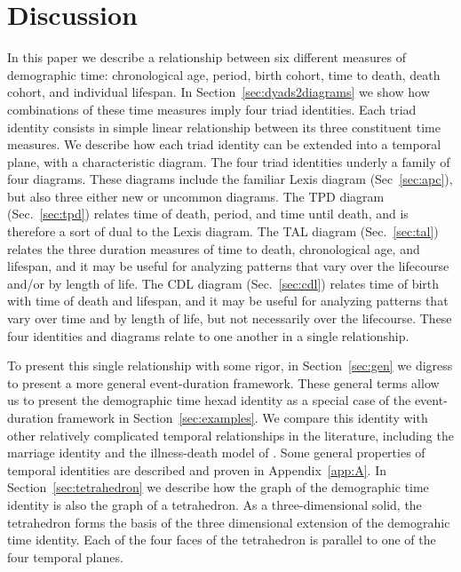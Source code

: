 \documentclass[12pt,oneside,a4paper]{article} %
\theoremstyle{definition}
\begin{document}
\section{Discussion}

In this paper we describe a relationship between six different measures of
demographic time: chronological age, period, birth cohort, time to death, death
cohort, and individual lifespan. In Section~\ref{sec:dyads2diagrams} we show how
combinations of these time measures imply four triad identities. Each
triad identity consists in simple linear relationship between its three
constituent time measures. We describe how each triad identity can be
extended into a temporal plane, with a characteristic diagram. The four triad
identities underly a family of four diagrams. These diagrams include the
familiar Lexis diagram (Sec~\ref{sec:apc}), but also three either new or
uncommon diagrams.
The TPD diagram (Sec.~\ref{sec:tpd}) relates time of death, period, and time
until death, and is therefore a sort of dual to the Lexis diagram. The TAL
diagram (Sec.~\ref{sec:tal}) relates the three duration measures of time to
death, chronological age, and lifespan, and it may be useful for analyzing patterns that vary over the lifecourse and/or by length of life.
The CDL diagram (Sec.~\ref{sec:cdl}) relates time of birth with time of death
and lifespan, and it may be useful for analyzing patterns that vary over time and by length of life,
but not necessarily over the lifecourse. These four identities and diagrams
relate to one another in a single relationship.

To present this single relationship with some rigor, in Section~\ref{sec:gen} we
digress to present a more general event-duration framework. These general terms
allow us to present the demographic time hexad identity as a special case of the
event-duration framework in Section~\ref{sec:examples}.
We compare this identity with other relatively complicated temporal
relationships in the literature, including the \citet{lexis1875einleitung}
marriage identity and the illness-death model of \citet{brinks}. Some general
properties of temporal identities are described and proven in
Appendix~\ref{app:A}.
In Section~\ref{sec:tetrahedron} we describe how the graph of the demographic time identity is also the graph of a tetrahedron. As a three-dimensional solid, the tetrahedron forms the basis of the three
dimensional extension of the demograhic time identity. Each of the four
faces of the tetrahedron is parallel to one of the four temporal planes.
\end{document}
